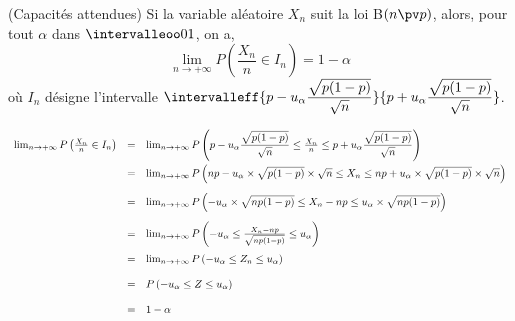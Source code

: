 \documentclass[12pt, french]{book}
\begin{document}

\begin{Thm}{(Capacités attendues)}
	Si la variable aléatoire $X_n$ suit la loi {\cursive B}$(n \pv p)$, alors, pour tout $\alpha$ dans $\intervalleoo 0 1$, on a,
	\[\lim_{n\to +\infty} P\left(\dfrac{X_n}{n}\in I_n\right)=1-\alpha\]
	où $I_n$ désigne l'intervalle $\intervalleff{p-u_{\alpha}\dfrac{\sqrt{p(1-p)}}{\sqrt{n}}}{p+u_{\alpha}\dfrac{\sqrt{p(1-p)}}{\sqrt{n}}}$.
	
\end{Thm}




\begin{Demo}
	\[\begin{array}{r@{\quad = \quad}l}
		\lim_{n \to + \infty} P\left(\frac{X_n}{n} \in I_n\right) & \lim_{n \to + \infty} P\left(p-u_{\alpha}\dfrac{\sqrt{p(1-p)}}{\sqrt{n}} \leq \frac{X_n}{n} \leq p+u_{\alpha}\dfrac{\sqrt{p(1-p)}}{\sqrt{n}}\right) \\[12pt]
		
		& \lim_{n \to + \infty} P\left(np - u_{\alpha} \times \sqrt{p(1-p)} \times \sqrt{n} \leq X_n \leq np + u_{\alpha} \times \sqrt{p(1-p)} \times \sqrt{n}\right) \\[12pt]
		
		& \lim_{n \to + \infty} P\left(- u_{\alpha} \times \sqrt{np(1-p)} \leq X_n - np \leq u_{\alpha} \times \sqrt{np(1-p)}\right) \\[12pt]
		
		& \lim_{n \to + \infty} P\left(- u_{\alpha}\leq \frac{X_n - np}{\sqrt{np(1-p)}} \leq u_{\alpha}\right) \\[12pt]
	
		& \lim_{n \to + \infty} P\left(- u_{\alpha}\leq Z_n \leq u_{\alpha}\right) \\[12pt]
		
		& P\left(- u_{\alpha}\leq Z \leq u_{\alpha}\right) \\[12pt]
		
		& 1 - \alpha
	\end{array}\]
\end{Demo}






\end{document}
